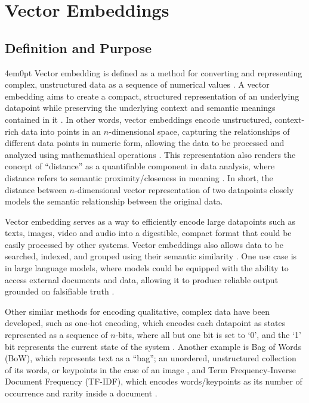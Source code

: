 \section{Vector Embeddings}
	\subsection{Definition and Purpose}
		\begin{indentedblock}{4em}{0pt}
			Vector embedding is defined as a method for converting and representing complex, unstructured data as a sequence of numerical values \parencites{vector_embeddings_pajo}{vector_embeddings_chitturi}. A vector embedding aims to create a compact, structured representation of an underlying datapoint while preserving the underlying context and semantic meanings contained in it \parencite{vector_embeddings_chitturi}. In other words, vector embeddings encode unstructured, context-rich data into points in an $n$-dimensional space, capturing the relationships of different data points in numeric form, allowing the data to be processed and analyzed using mathemathical operations \parencite{vector_embeddings_pajo}. This representation also renders the concept of ``distance'' as a quantifiable component in data analysis, where distance refers to semantic proximity/closeness in meaning \parencite{vector_database_sanjay}. In short, the distance between $n$-dimensional vector representation of two datapoints closely models the semantic relationship between the original data. 
			
			
			Vector embedding serves as a way to efficiently encode large datapoints such as texts, images, video and audio into a digestible, compact format that could be easily processed by other systems. Vector embeddings also allows data to be searched, indexed, and grouped using their semantic similarity \parencite{vector_database_taipalus}. One use case is in large language models, where models could be equipped with the ability to access external documents and data, allowing it to produce reliable output grounded on falsifiable truth \parencite{vector_embedding_omolayo}.
			
			
			Other similar methods for encoding qualitative, complex data have been developed, such as one-hot encoding, which encodes each datapoint as states represented as a sequence of $n$-bits, where all but one bit is set to `0', and the `1' bit represents the current state of the system \parencite{one_hot_encoding_samuels}. Another example is Bag of Words (BoW), which represents text as a ``bag''; an unordered, unstructured collection of its words, or keypoints in the case of an image \parencite{bag_of_words_qader}, and Term Frequency-Inverse Document Frequency (TF-IDF), which encodes words/keypoints as its number of occurrence and rarity inside a document \parencite{tf_idf_qaiser}. 
			

\end{indentedblock}
